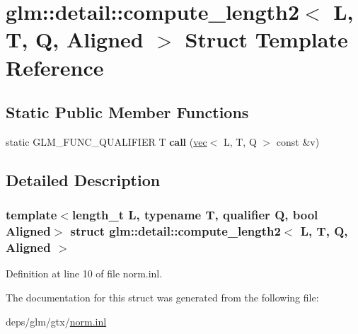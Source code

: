 \hypertarget{structglm_1_1detail_1_1compute__length2}{}\section{glm\+:\+:detail\+:\+:compute\+\_\+length2$<$ L, T, Q, Aligned $>$ Struct Template Reference}
\label{structglm_1_1detail_1_1compute__length2}
\subsection*{Static Public Member Functions}
\begin{DoxyCompactItemize}
\item 
\mbox{\label{structglm_1_1detail_1_1compute__length2_ac2b815d887a70ae91613c510a6adc07d}} 
static G\+L\+M\+\_\+\+F\+U\+N\+C\+\_\+\+Q\+U\+A\+L\+I\+F\+I\+ER T {\bfseries call} (\hyperlink{structglm_1_1vec}{vec}$<$ L, T, Q $>$ const \&v)
\end{DoxyCompactItemize}


\subsection{Detailed Description}
\subsubsection*{template$<$length\+\_\+t L, typename T, qualifier Q, bool Aligned$>$\newline
struct glm\+::detail\+::compute\+\_\+length2$<$ L, T, Q, Aligned $>$}



Definition at line 10 of file norm.\+inl.



The documentation for this struct was generated from the following file\+:\begin{DoxyCompactItemize}
\item 
deps/glm/gtx/\hyperlink{norm_8inl}{norm.\+inl}\end{DoxyCompactItemize}
